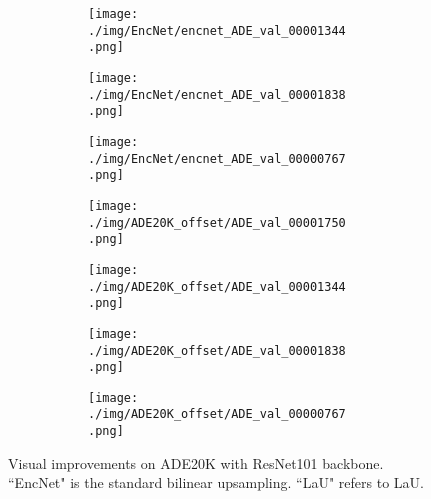 \documentclass[10pt,twocolumn,letterpaper]{article}
\begin{document}
\begin{figure}
\begin{subfigure}[t]{0.11\textwidth}
        \begin{subfigure}[t]{\textwidth}
                \texttt{[image: ./img/EncNet/encnet\_ADE\_val\_00001344.png]}
            \end{subfigure}\vspace{.1ex}

        \begin{subfigure}[t]{\textwidth}
                \texttt{[image: ./img/EncNet/encnet\_ADE\_val\_00001838.png]}
            \end{subfigure}\vspace{.1ex}

            \begin{subfigure}[t]{\textwidth}
                \texttt{[image: ./img/EncNet/encnet\_ADE\_val\_00000767.png]}
            \captionsetup{justification=centering}
        \label{d}
            \end{subfigure}
    \end{subfigure}
\begin{subfigure}[t]{0.11\textwidth}
        \begin{subfigure}[t]{\textwidth}
                \texttt{[image: ./img/ADE20K\_offset/ADE\_val\_00001750.png]}
            \end{subfigure}\vspace{.1ex}

        \begin{subfigure}[t]{\textwidth}
                \texttt{[image: ./img/ADE20K\_offset/ADE\_val\_00001344.png]}
            \end{subfigure}\vspace{.1ex}

        \begin{subfigure}[t]{\textwidth}
                \texttt{[image: ./img/ADE20K\_offset/ADE\_val\_00001838.png]}
            \end{subfigure}\vspace{.1ex}

            \begin{subfigure}[t]{\textwidth}
                \texttt{[image: ./img/ADE20K\_offset/ADE\_val\_00000767.png]}
        \label{e}
            \end{subfigure}
    \end{subfigure}
        \caption{Visual improvements on ADE20K with ResNet101 backbone. ``EncNet" is the standard bilinear upsampling. ``LaU" refers to LaU.}
\label{cmp}
\end{figure}
\end{document}
